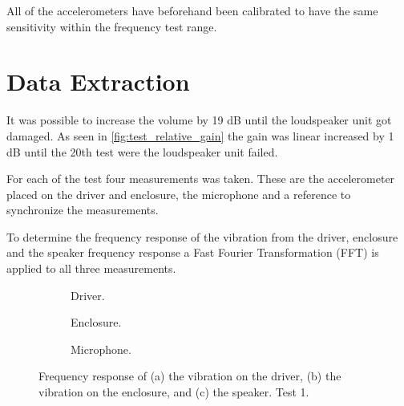 \begin{figure}[H]
\centering
{}

\caption{}
\label{fig:linear_freq_sweep}
\end{figure}

All of the accelerometers have beforehand been calibrated to have the same sensitivity within the frequency test range.


\section{Data Extraction}

It was possible to increase the volume by 19 dB until the loudspeaker unit got damaged. As seen in \autoref{fig:test_relative_gain} the gain was linear increased by 1 dB until the 20th test were the loudspeaker unit failed.

\begin{figure}[H]
\centering
{}

\caption{}
\label{fig:test_relative_gain}
\end{figure}

For each of the test four measurements was taken. These are the accelerometer placed on the driver and enclosure, the microphone and a reference to synchronize the measurements. 


To determine the frequency response of the vibration from the driver, enclosure and the speaker frequency response a Fast Fourier Transformation (FFT) is applied to all three measurements.

\begin{figure}[H]
\centering
\begin{subfigure}[t]{0.37\textwidth}
	
	\caption{Driver.}
	\label{fig:FFT_driver1}
\end{subfigure}
\begin{subfigure}[t]{0.28\textwidth}
	
	\caption{Enclosure.}
	\label{fig:FFT_enclosure1}
\end{subfigure}
\begin{subfigure}[t]{0.32\textwidth}
	
	\caption{Microphone.}
	\label{fig:FFT_mic1}
\end{subfigure}
\caption{Frequency response of (a) the vibration on the driver, (b) the vibration on the enclosure, and (c) the speaker. Test 1.}
\label{fig:FFT1}
\end{figure}

